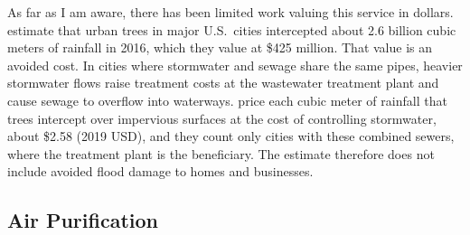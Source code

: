 \documentclass[12pt]{article}
\begin{document}
As far as I am aware, there has been limited work valuing this service in dollars. \citet{herisPilotingUrbanEcosystem2021} estimate that urban trees in major U.S.\ cities intercepted about 2.6 billion cubic meters of rainfall in 2016, which they value at \$425 million. That value is an avoided cost. In cities where stormwater and sewage share the same pipes, heavier stormwater flows raise treatment costs at the wastewater treatment plant and cause sewage to overflow into waterways. \citet{herisPilotingUrbanEcosystem2021} price each cubic meter of rainfall that trees intercept over impervious surfaces at the cost of controlling stormwater, about \$2.58 (2019 USD), and they count only cities with these combined sewers, where the treatment plant is the beneficiary. The estimate therefore does not include avoided flood damage to homes and businesses.


\subsection{Air Purification}\label{sec:air}
\end{document}
